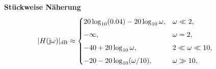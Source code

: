 \vspace{0.5cm}
\medskip
\noindent\textbf{Stückweise Näherung}
\[
|H(\operatorname{j}\!\omega)|_{\mathrm{dB}}\approx
\begin{cases}
20\log_{10}(0.04)-20\log_{10}\omega,& \omega\ll2,\\[4pt]
-\infty,& \omega=2,\\[4pt]
-40+20\log_{10}\omega,& 2\ll\omega\ll10,\\[4pt]
-20-20\log_{10}(\omega/10),& \omega\gg10,
\end{cases}
\qquad
\]
\newpage